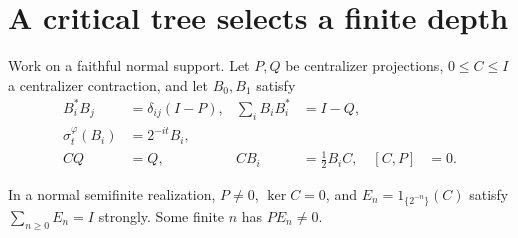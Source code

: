 
\section{A critical tree selects a finite depth}\label{sec:selector}
Work on a faithful normal support. Let $P,Q$ be centralizer projections,
$0\leq C\leq I$ a centralizer contraction, and let $B_0,B_1$ satisfy
\begin{align}
 B_i^*B_j&=\delta_{ij}(I-P),&
 \sum_iB_iB_i^*&=I-Q,\label{eq:tree}\\
 \sigma_t^\varphi(B_i)&=2^{-it}B_i,\label{eq:modular}\\
 CQ&=Q,& CB_i&=\tfrac12B_iC,&[C,P]&=0.\label{eq:depth}
\end{align}
\begin{lemma}\label{lem:selector}
In a normal semifinite realization, $P\ne0$, $\ker C=0$, and
$E_n=1_{\{2^{-n}\}}(C)$ satisfy $\sum_{n\geq0}E_n=I$ strongly.
Some finite $n$ has $PE_n\ne0$.
\end{lemma}
